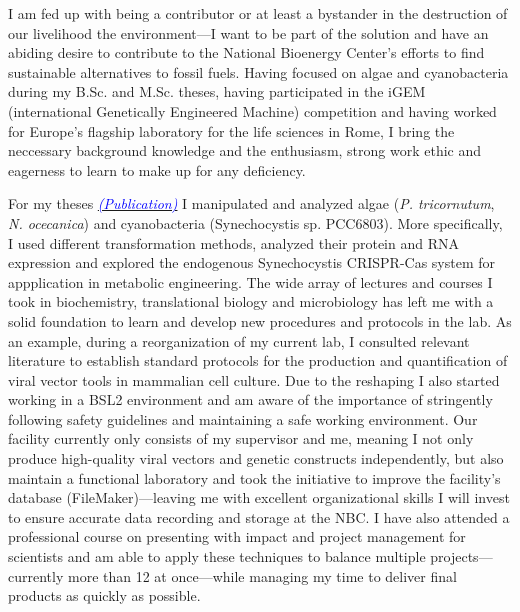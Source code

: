 \documentclass[11pt,a4paper,sans]{moderncv}
\date{\today}
\begin{document}
     
\makelettertitle
\begin{spacing}{1.15}

I am fed up with being a contributor or at least a bystander in the destruction of our livelihood the environment---I want to be part of the solution and have an abiding desire to contribute to the National Bioenergy Center's efforts to find sustainable alternatives to fossil fuels. %
Having focused on algae and cyanobacteria during my B.Sc. and M.Sc. theses, having participated in the iGEM (international Genetically Engineered Machine) competition and having worked for Europe's flagship laboratory for the life sciences in Rome, I bring the neccessary background knowledge and the enthusiasm, strong work ethic and eagerness to learn to make up for any deficiency.%
\par\vspace*{1mm}


For my theses {\href{https://www.ncbi.nlm.nih.gov/pubmed/29517395}{\textcolor{blue}{{\textit{(Publication)}}}}} I manipulated and analyzed algae (\textit{P. tricornutum}, \textit{N. ocecanica}) and cyanobacteria (Synechocystis sp. PCC6803). 
More specifically, I used different transformation methods, analyzed their protein and RNA expression and explored the endogenous Synechocystis CRISPR-Cas system for appplication in metabolic engineering. 
The wide array of lectures and courses I took in biochemistry, translational biology and microbiology has  left me with a solid foundation to learn and develop new procedures and protocols in the lab. 
As an example, during a reorganization of my current lab, I consulted relevant literature to establish standard protocols for the production and quantification of viral vector tools in mammalian cell culture. 
Due to the reshaping I also started working in a BSL2 environment and am aware of the importance of stringently following safety guidelines and maintaining a safe working environment. 
Our facility currently only consists of my supervisor and me, meaning I not only produce high-quality viral vectors and genetic constructs independently, but also maintain a functional laboratory and took the initiative to improve the facility's database (FileMaker)---leaving me with excellent organizational skills I will invest to ensure accurate data recording and storage at the NBC.  
I have also attended a professional course on presenting with impact and project management for scientists and am able to apply these techniques to balance multiple projects---currently more than 12 at once---while managing my time to deliver final products as quickly as possible.  \par%


\end{spacing}
\end{document}
